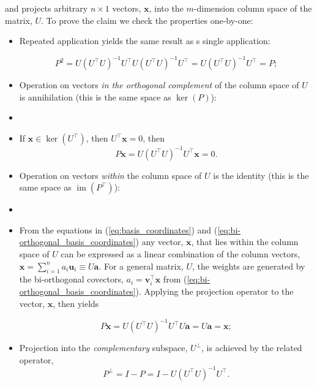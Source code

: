 \documentclass[12pt, twoside, draft]{article}
\begin{document}
and projects arbitrary $n \times 1$ vectors, $\mathbf{x}$, into the $m$-dimension column space of the matrix, $U$.  To prove the claim we check the properties one-by-one:
\begin{itemize}[noitemsep]
\item Repeated application yields the same result as s single application:

\begin{equation}\label{eq:test_projection_idempotency}
P^2 = U(U^\top U)^{-1} U^\top U(U^\top U)^{-1} U^\top = U(U^\top U)^{-1} U^\top = P;
\end{equation}

\item Operation on vectors \textit{in the orthogonal complement} of the column space of $U$ is annihilation (this is the same space as $\ker(P)$):
\item[]
\item[] If $\mathbf{x} \in \ker(U^\top)$, then $U^\top \mathbf{x} = 0$, then
\begin{equation}\label{eq:test_projection_annihilation}
P\mathbf{x} = U(U^\top U)^{-1} U^\top \mathbf{x} = 0.
\end{equation}

\item Operation on vectors \textit{within} the column space of $U$ is the identity (this is the same space as $\operatorname{im}(P^\top)$):
\item[]
\item[] From the equations in (\ref{eq:basis_coordinates}) and (\ref{eq:bi-orthogonal_basis_coordinates}) any vector, $\mathbf{x}$, that lies within the column space of $U$ can be expressed as a linear combination of the column vectors, $\mathbf{x} = \sum_{i=1}^n a_i \mathbf{u}_i \equiv U\mathbf{a}$.  For a general matrix, $U$, the weights are generated by the bi-orthogonal covectors, $a_i = \mathbf{v}_i^\top \mathbf{x}$ from (\ref{eq:bi-orthogonal_basis_coordinates}). Applying the projection operator to the vector, $\mathbf{x}$, then yields 

\begin{equation}\label{eq:test_projection_identity}
P\mathbf{x} = U(U^\top U)^{-1} U^\top U\mathbf{a} = U \mathbf{a} = \mathbf{x};
\end{equation}

\item Projection into the \textit{complementary} subspace, $U^{\perp}$, is achieved by the related operator,
\begin{equation}\label{eq:complementary_projection}
P^\perp = I - P = I - U(U^\top U)^{-1} U^\top.
\end{equation}

\end{itemize}
\end{document}
